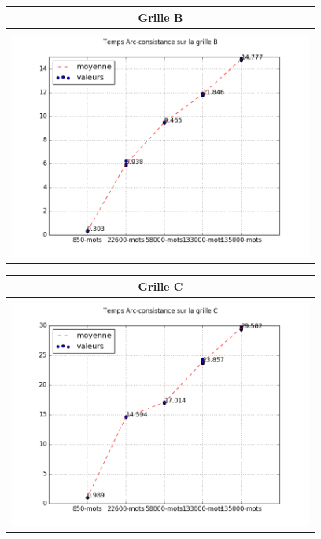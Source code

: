 \documentclass[a4paper,12pt]{report}
\begin{document}
\begin{enumerate}
\begin{table}[!h]
\begin{center}
\begin{tabular}{|c|}
\end{tabular}
\end{center}
\end{table}

\begin{table}[!h]
\begin{center}
\begin{tabular}{|c|}
\hline
Grille B \\
\hline 
\\
\includegraphics[width=10cm]{AC3_B.png} \\
\hline

\end{tabular}
\end{center}
\end{table}


\begin{table}[!h]
\begin{center}
\begin{tabular}{|c|}
\hline
Grille C\\
\hline
  \\
\includegraphics[width=10cm]{AC3_C.png} \\
\hline


\end{tabular}
\end{center}
\end{table}
\end{enumerate}
\end{document}
